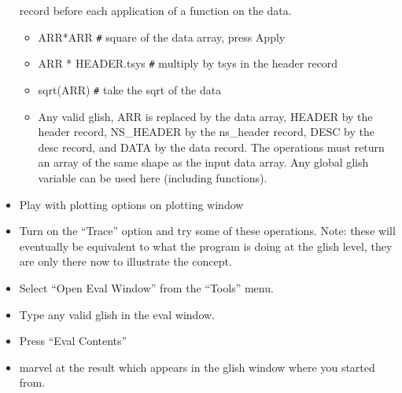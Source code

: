 \begin{itemize}
record before each application of a function on the data.
\begin{itemize}
\item ARR*ARR  \verb_#_ square of the data array, press Apply
\item ARR * HEADER.tsys  \verb_#_ multiply by tsys in the header record
\item sqrt(ARR) \verb_#_ take the sqrt of the data
\item Any valid glish, ARR is replaced by the data array, HEADER by
the header record, NS\_HEADER by the ns\_header record, DESC by the 
desc record, and DATA by the data record.  The operations must return
an array of the same shape as the input data array.  Any global glish
variable can be used here (including functions).
\end{itemize}
\item Play with plotting options on plotting window
\item Turn on the ``Trace'' option and try some of these operations.
Note: these will eventually be equivalent to what the program is doing
at the glish level, they are only there now to illustrate the concept.
\item Select ``Open Eval Window'' from the ``Tools'' menu.
\item Type any valid glish in the eval window.
\item Press ``Eval Contents''
\item marvel at the result which appears in the glish window where you
started from.
\end{itemize}
